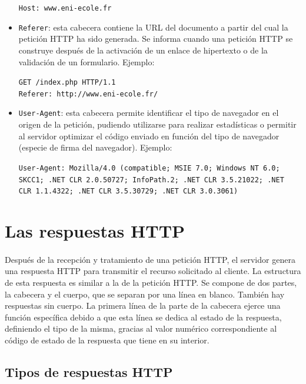 \documentclass{article}
\begin{document}
\begin{itemize}
		\begin{center}
			\texttt{Host: www.eni-ecole.fr}
		\end{center}
		\item \texttt{Referer}: esta cabecera contiene la URL del documento a partir del cual la petición HTTP ha sido generada. Se informa cuando una petición HTTP se construye después de la activación de un enlace de hipertexto o de la validación de un formulario. Ejemplo:
		\begin{center}
			\texttt{GET /index.php HTTP/1.1\\
			Referer: http://www.eni-ecole.fr/}
		\end{center}
		\item \texttt{User-Agent}: esta cabecera permite identificar el tipo de navegador en el origen de la petición, pudiendo utilizarse para realizar estadísticas o permitir al servidor optimizar el código enviado en función del tipo de navegador (especie de firma del navegador). Ejemplo:
		\begin{center}
			\texttt{User-Agent: Mozilla/4.0 (compatible; MSIE 7.0; Windows NT 6.0;\\
			SKCC1; .NET CLR 2.0.50727; InfoPath.2; .NET CLR 3.5.21022; .NET\\
			CLR 1.1.4322; .NET CLR 3.5.30729; .NET CLR 3.0.3061)}
		\end{center}
	\end{itemize}
	
	\section{Las respuestas HTTP}
	
	\paragraph{}Después de la recepción y tratamiento de una petición HTTP, el servidor genera una respuesta HTTP para transmitir el recurso solicitado al cliente. La estructura de esta respuesta es similar a la de la petición HTTP. Se compone de dos partes, la cabecera y el cuerpo, que se separan por una línea en blanco. También hay respuestas sin cuerpo. La primera línea de la parte de la cabecera ejerce una función específica debido a que esta línea se dedica al estado de la respuesta, definiendo el tipo de la misma, gracias al valor numérico correspondiente al código de estado de la respuesta que tiene en su interior.
	
	\subsection{Tipos de respuestas HTTP}
	
\end{document}
